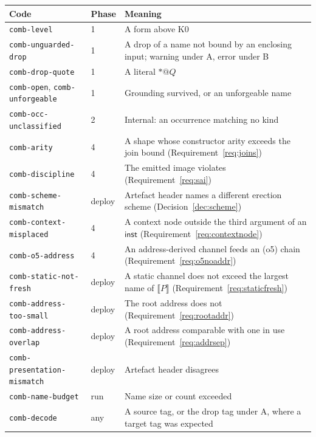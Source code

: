 \documentclass[11pt,a4paper]{article}
\makeatletter
\newcommand{\code}[1]{\texttt{#1}}
\newcommand{\quo}[1]{@#1}
\newcommand{\drp}[1]{{*}#1}
\newcommand{\enc}[1]{\llbracket #1 \rrbracket}
\newcommand{\inst}{\mathsf{inst}}
\theoremstyle{definition}
\theoremstyle{plain}
\makeatother
\begin{document}
\begin{center}
\begin{tabularx}{\linewidth}{@{}ll>{\raggedright\arraybackslash}X@{}}
\toprule
Code & Phase & Meaning\\
\midrule
\code{comb-level} & 1 & A form above K0\\
\code{comb-unguarded-drop} & 1 & A drop of a name not bound by an enclosing
input; warning under A, error under B\\
\code{comb-drop-quote} & 1 & A literal $\drp{\quo{Q}}$\\
\code{comb-open}, \code{comb-unforgeable} & 1 & Grounding survived, or an
unforgeable name\\
\code{comb-occ-unclassified} & 2 & Internal: an occurrence matching no kind\\
\code{comb-arity} & 4 & A shape whose constructor arity exceeds the join bound
(Requirement~\ref{req:joins})\\
\code{comb-discipline} & 4 & The emitted image violates
\cite[Def.~6.10]{draft3} (Requirement~\ref{req:sai})\\
\code{comb-scheme-mismatch} & deploy & Artefact header names a different
erection scheme (Decision~\ref{dec:scheme})\\
\code{comb-context-misplaced} & 4 & A context node outside the third argument
of an $\inst$ (Requirement~\ref{req:contextnode})\\
\code{comb-o5-address} & 4 & An address-derived channel feeds an (o5) chain
(Requirement~\ref{req:o5noaddr})\\
\code{comb-static-not-fresh} & deploy & A static channel does not exceed the
largest name of $\enc{P}$ (Requirement~\ref{req:staticfresh})\\
\code{comb-address-too-small} & deploy & The root address does not
(Requirement~\ref{req:rootaddr})\\
\code{comb-address-overlap} & deploy & A root address comparable with one in
use (Requirement~\ref{req:addrsep})\\
\code{comb-presentation-mismatch} & deploy & Artefact header disagrees\\
\code{comb-name-budget} & run & Name size or count exceeded\\
\code{comb-decode} & any & A source tag, or the drop tag under A, where a
target tag was expected\\
\bottomrule
\end{tabularx}
\end{center}
\end{document}
